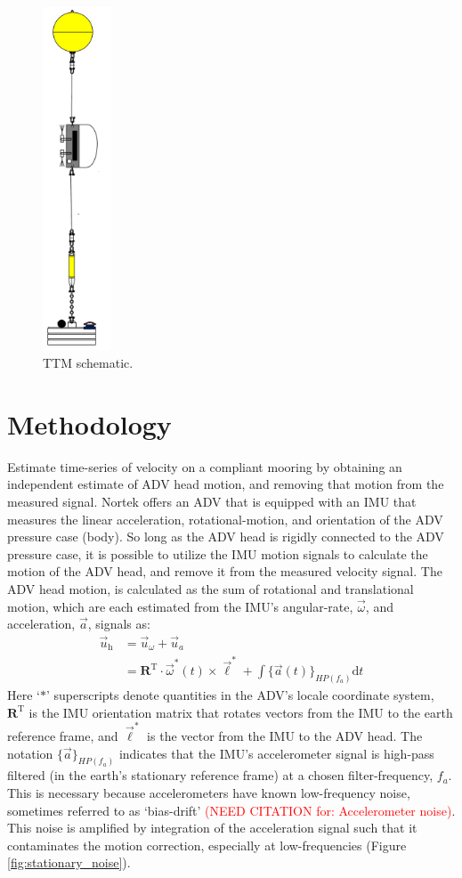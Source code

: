 \documentclass[twocol]{ametsoc}
\newcommand{\citeneeded}[1]{\textcolor{red}{(NEED CITATION for: #1)}}
\def\earth{}
\def\omatinv{\ensuremath{\mathbf{R}^\mathrm{T}}}
\def\ue{\ensuremath{\vec{u}\earth}}
\def\uacc{\ensuremath{\ue_a}}
\def\AngRt{\ensuremath{\vec{\omega}}}
\def\Accel{\ensuremath{{\vec{a}}}}
\def\ue{\ensuremath{\vec{u}\earth}}
\def\um{\ensuremath{\ue_\mathrm{h}}}
\def\urot{\ensuremath{\ue_\omega}}
\def\uacc{\ensuremath{\ue_a}}
\def\l{\ensuremath{\vec{\ell}}}
\begin{document}
\begin{figure}[t]
  \centering
  \includegraphics[width=0.8in]{ttm06}
  \caption{TTM schematic.}
  \label{fig:ttm_schematic}
\end{figure}


\section{Methodology}

Estimate time-series of velocity on a compliant mooring by obtaining an independent estimate of ADV head motion, and removing that motion from the measured signal. Nortek offers an ADV that is equipped with an IMU that measures the linear acceleration, rotational-motion, and orientation of the ADV pressure case (body). So long as the ADV head is rigidly connected to the ADV pressure case, it is possible to utilize the IMU motion signals to calculate the motion of the ADV head, and remove it from the measured velocity signal.  The ADV head motion, is calculated as the sum of rotational and translational motion, which are each estimated from the IMU's angular-rate, \AngRt, and acceleration, \Accel, signals as:
\begin{align}
  \um & = \urot + \uacc \\
      & = \omatinv \cdot \AngRt^*(t)\times\l^* + \int \{\Accel(t)\}_{HP(f_{a})} \mathrm{d}t
\end{align}
Here `$*$' superscripts denote quantities in the ADV's locale coordinate system, $\omatinv$ is the IMU orientation matrix that rotates vectors from the IMU to the earth reference frame, and $\l^*$ is the vector from the IMU to the ADV head. The notation $\{\Accel\}_{HP(f_a)}$ indicates that the IMU's accelerometer signal is high-pass filtered (in the earth's stationary reference frame) at a chosen filter-frequency, $f_a$. This is necessary because accelerometers have known low-frequency noise, sometimes referred to as `bias-drift' \citeneeded{Accelerometer noise}. This noise is amplified by integration of the acceleration signal such that it contaminates the motion correction, especially at low-frequencies (Figure \ref{fig:stationary_noise}).
\end{document}
